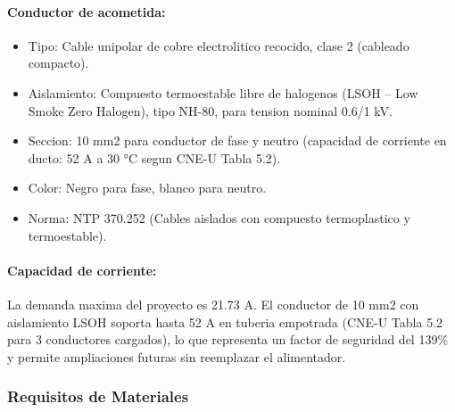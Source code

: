 \paragraph{Conductor de acometida:}
\begin{itemize}[nosep]
  \item Tipo: Cable unipolar de cobre electrolitico recocido, clase 2 (cableado compacto).
  \item Aislamiento: Compuesto termoestable libre de halogenos (LSOH -- Low Smoke Zero Halogen), tipo NH-80, para tension nominal 0.6/1 kV.
  \item Seccion: 10 mm2 para conductor de fase y neutro (capacidad de corriente en ducto: 52 A a 30 °C segun CNE-U Tabla 5.2).
  \item Color: Negro para fase, blanco para neutro.
  \item Norma: NTP 370.252 (Cables aislados con compuesto termoplastico y termoestable).
\end{itemize}

\paragraph{Capacidad de corriente:}
La demanda maxima del proyecto es 21.73 A. El conductor de 10 mm2 con aislamiento LSOH soporta hasta 52 A en tuberia empotrada (CNE-U Tabla 5.2 para 3 conductores cargados), lo que representa un factor de seguridad del 139\% y permite ampliaciones futuras sin reemplazar el alimentador.

\subsubsection{Requisitos de Materiales}

